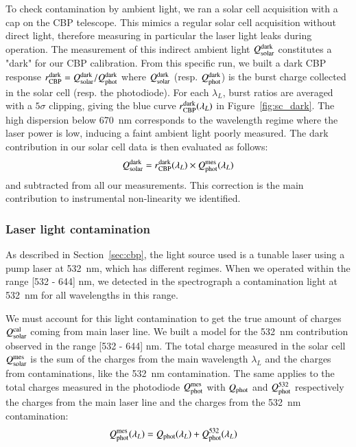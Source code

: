 To check contamination by ambient light, we ran a solar cell acquisition with a cap on the CBP telescope. This mimics a regular solar cell acquisition without direct light, therefore measuring in particular the laser light leaks during operation. The measurement of this indirect ambient light $Q_{\mathrm{solar}}^{\rm dark}$ constitutes a "dark" for our CBP calibration. From this specific run, we built a dark CBP response $r_{\mathrm{CBP}}^{\rm dark} = Q_{\mathrm{solar}}^{\rm dark} / Q_{\mathrm{phot}}^{\rm dark}$ where $Q_{\mathrm{solar}}^{\rm dark}$ (resp. $Q_{\mathrm{phot}}^{\rm dark}$) is the burst charge collected in the solar cell (resp. the photodiode). For each $\lambda_L$, burst ratios are averaged with a $5\sigma$ clipping, giving the blue curve $r_{\mathrm{CBP}}^{\rm dark}(\lambda_L)$ in Figure~\ref{fig:sc_dark}. The high dispersion below \SI{670}{\nano\meter} corresponds to the wavelength regime where the laser power is low, inducing a faint ambient light poorly measured. The dark contribution in our solar cell data is then evaluated as follows:
\begin{equation}
    Q_{\mathrm{solar}}^{\rm dark} = r_{\mathrm{CBP}}^{\rm dark}(\lambda_L) \times Q_{\mathrm{phot}}^{\mathrm{mes}}(\lambda_L)
\end{equation}
and subtracted from all our measurements. This correction is the main contribution to instrumental non-linearity we identified. 


\subsubsection{Laser light contamination}
\label{sec:532_cont}

As described in Section~\ref{sec:cbp}, the light source used is a tunable laser using a pump laser at \SI{532}{\nano\meter}, which has different regimes. When we operated within the range [532 - 644] nm, we detected in the spectrograph a contamination light at \SI{532}{\nano\meter} for all wavelengths in this range. 

We must account for this light contamination to get the true amount of charges $Q_{\mathrm{solar}}^{\mathrm{cal}}$ coming from main laser line. We built a model for the \SI{532}{\nano\meter} contribution observed in the range [532 - 644] nm. The total charge measured in the solar cell $Q_{\mathrm{solar}}^{\mathrm{mes}}$ is the sum of the charges from the main wavelength $\lambda_L$ and the charges from contaminations, like the \SI{532}{\nm} contamination. The same applies to the total charges measured in the photodiode $Q_{\mathrm{phot}}^{\mathrm{mes}}$ with $Q_{\mathrm{phot}}$ and $Q_{\mathrm{phot}}^{532}$ respectively the charges from the main laser line and the charges from the \SI{532}{\nm} contamination:
\begin{align}
Q_{\mathrm{phot}}^{\mathrm{mes}}(\lambda_L) & = Q_{\mathrm{phot}}(\lambda_L) + Q_{\mathrm{phot}}^{532}(\lambda_L) \label{eq:qphot_mes}
\end{align}

